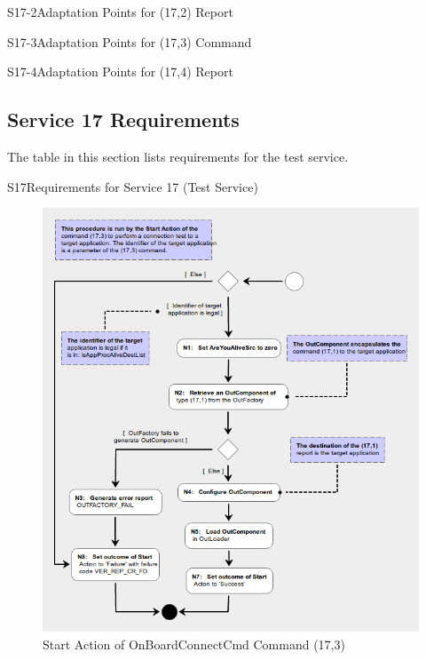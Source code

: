 \documentclass[a4paper,10pt]{article}
\newenvironment{cr_req}[2]
{
\begin{longtable}{|l|p{11.8cm}|}
\caption{#2}\label{tab:Req-#1} \\
\hline
\rowcolor{light-gray}
\textbf{Req. ID} & \textbf{Requirement Text}\\
\hline\hline
\endfirsthead
\rowcolor{light-gray}
\textbf{Req. ID} & \textbf{Requirement Text}\\
\hline\hline
\endhead
\DTLforeach*[\DTLiseq{\cat}{#1}]{dbReq}{\cat=Category,\type=Type,\id=Id,\reqText=Text}
{\DTLiffirstrow{}{\\\hline}P-\cat-\id/\type & \textit{\reqText}}\\\hline
}
{\end{longtable}}
\newenvironment{cr_ap}[2]
{
\begin{longtable}{|l|p{4.7cm}|p{6.9cm}|}
\caption{#2}\label{tab:AP-#1} \\
\hline
\rowcolor{light-gray}
\textbf{AP ID} & \textbf{Adaptation Point} & \textbf{Default Value}\\
\hline\hline
\endfirsthead
\rowcolor{light-gray}
\textbf{AP ID} & \textbf{Adaptation Point} & \textbf{Default Value}\\
\hline\hline
\endhead
\DTLforeach*[\DTLiseq{\cat}{#1}]{dbAP}{\cat=Category,\origin=Origin,\id=Id,\ap=AP,\defValue=DefValue}
{\DTLiffirstrow{}{\\\hline}P-\cat-\id & \ap\ (\origin) & \defValue}\\\hline
}
{\end{longtable}}
\begin{document}
\begin{cr_ap}{S17-2}{Adaptation Points for (17,2) Report}
\end{cr_ap}

\begin{cr_ap}{S17-3}{Adaptation Points for (17,3) Command}
\end{cr_ap}

\begin{cr_ap}{S17-4}{Adaptation Points for (17,4) Report}
\end{cr_ap}

\subsection{Service 17 Requirements}
The table in this section lists requirements for the test service.

\begin{cr_req}{S17}{Requirements for Service 17 (Test Service)}
\end{cr_req}

\newpage
\begin{figure}[H]
 \centering
 \includegraphics[scale=0.415,keepaspectratio=true]{CrPsCmd17s3Start.png}
 \caption{Start Action of OnBoardConnectCmd Command (17,3)}
 \label{fig:Cmd17s3Start}
\end{figure}
\end{document}
